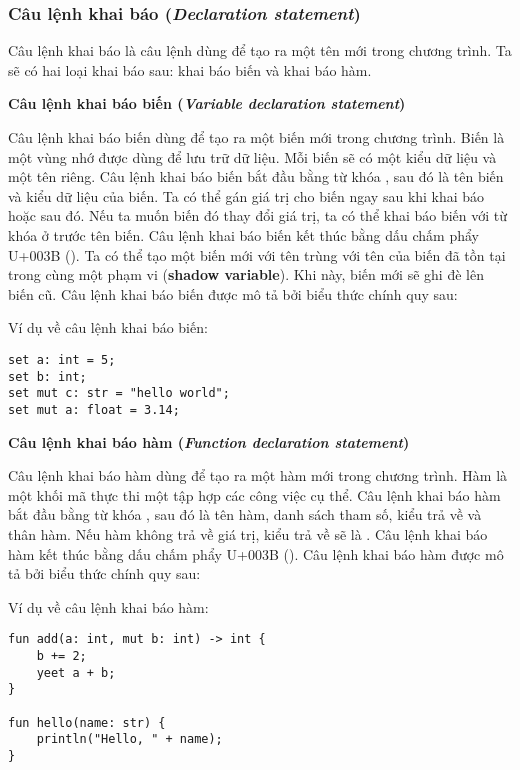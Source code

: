 \subsubsection{Câu lệnh khai báo (\textit{Declaration statement})}

Câu lệnh khai báo là câu lệnh dùng để tạo ra một tên mới trong chương trình. Ta sẽ có hai loại khai báo sau: khai báo biến và khai báo hàm.

\regexdeclstmt

\noindent\textbf{\label{ch2:decl_var_stmt}Câu lệnh khai báo biến (\textit{Variable declaration statement})}

    Câu lệnh khai báo biến dùng để tạo ra một biến mới trong chương trình. Biến là một vùng nhớ được dùng để lưu trữ dữ liệu. Mỗi biến sẽ có một kiểu dữ liệu và một tên riêng. Câu lệnh khai báo biến bắt đầu bằng từ khóa , sau đó là tên biến và kiểu dữ liệu của biến. Ta có thể gán giá trị cho biến ngay sau khi khai báo hoặc sau đó. Nếu ta muốn biến đó thay đổi giá trị, ta có thể khai báo biến với từ khóa  ở trước tên biến. Câu lệnh khai báo biến kết thúc bằng dấu chấm phẩy U+003B (\kw{;}). Ta có thể tạo một biến mới với tên trùng với tên của biến đã tồn tại trong cùng một phạm vi (\textbf{shadow variable}). Khi này, biến mới sẽ ghi đè lên biến cũ. Câu lệnh khai báo biến được mô tả bởi biểu thức chính quy sau:

\regexvardeclstmt

\noindent Ví dụ về câu lệnh khai báo biến:
\begin{lstlisting}[]
set a: int = 5;
set b: int;
set mut c: str = "hello world";
set mut a: float = 3.14;
\end{lstlisting}

\noindent\textbf{\label{ch2:decl_func_stmt}Câu lệnh khai báo hàm (\textit{Function declaration statement})}

    Câu lệnh khai báo hàm dùng để tạo ra một hàm mới trong chương trình. Hàm là một khối mã thực thi một tập hợp các công việc cụ thể. Câu lệnh khai báo hàm bắt đầu bằng từ khóa , sau đó là tên hàm, danh sách tham số, kiểu trả về và thân hàm. Nếu hàm không trả về giá trị, kiểu trả về sẽ là . Câu lệnh khai báo hàm kết thúc bằng dấu chấm phẩy U+003B (\kw{;}). Câu lệnh khai báo hàm được mô tả bởi biểu thức chính quy sau:

\regexfuncdeclstmt

\noindent Ví dụ về câu lệnh khai báo hàm:
\begin{lstlisting}[]
fun add(a: int, mut b: int) -> int {
    b += 2;
    yeet a + b;
}

fun hello(name: str) {
    println("Hello, " + name);
}
\end{lstlisting}
